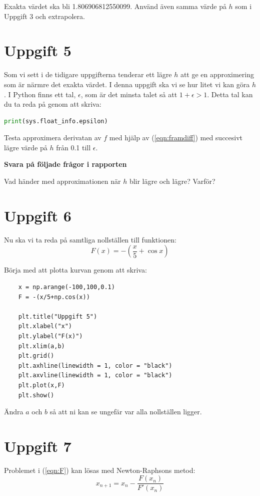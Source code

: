 \documentclass[a4paper]{article}
\begin{document}
Exakta värdet ska bli 1.806906812550099. Använd även samma värde på \(h\)  som i Uppgift 3
och extrapolera.

\section{Uppgift 5}
Som vi sett i de tidigare uppgifterna tenderar ett lägre \(h\) att ge en approximering som är närmre det exakta värdet.
I denna uppgift ska vi se hur litet vi kan göra \(h\). I Python finns ett tal, \(\epsilon\), som är det minsta talet så att \(1+\epsilon>1\). Detta tal kan du ta reda på genom att skriva:

\begin{lstlisting}[language=Python]
  print(sys.float_info.epsilon)
\end{lstlisting}

Testa approximera derivatan av \(f\) med hjälp av (\ref{eqn:framdiff}) med succesivt lägre värde på \(h\) från 0.1
till \(\epsilon\).

\textbf{Svara på följade frågor i rapporten}

Vad händer med approximationen när \(h\) blir lägre och lägre? Varför?


\newpage
\section{Uppgift 6}
Nu ska vi ta reda på samtliga nollställen till funktionen:
\begin{equation} \label{eqn:F}
  F(x)=-\left(\frac{x}{5}+\cos x\right)
\end{equation}

Börja med att plotta kurvan genom att skriva:
\begin{lstlisting}
    x = np.arange(-100,100,0.1)
    F = -(x/5+np.cos(x))

    plt.title("Uppgift 5") 
    plt.xlabel("x") 
    plt.ylabel("F(x)") 
    plt.xlim(a,b) 
    plt.grid()
    plt.axhline(linewidth = 1, color = "black")
    plt.axvline(linewidth = 1, color = "black")
    plt.plot(x,F)
    plt.show()
\end{lstlisting}
Ändra \( a  \) och \( b  \) så att ni kan se ungefär var alla nollställen ligger.


\section{Uppgift 7}
Problemet i (\ref{eqn:F}) kan lösas med Newton-Raphsons metod:
\begin{equation} \label{eqn:newton_rhapson}
  x_{n+1}=x_n-\frac{F(x_n)}{F'(x_n)}
\end{equation}
\end{document}
